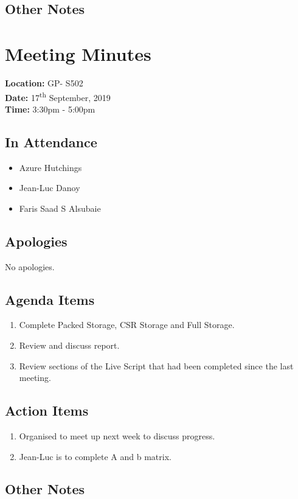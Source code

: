\documentclass{article}
\begin{document}
\subsection*{Other Notes}

\pagebreak

\section{Meeting Minutes}
\textbf{Location:} GP- S502 \\
\textbf{Date:} 17\textsuperscript{th} September, 2019 \\
\textbf{Time:} 3:30pm - 5:00pm

\subsection*{In Attendance}
\begin{itemize}
\item Azure Hutchings
\item Jean-Luc Danoy
\item Faris Saad S Alsubaie
\end{itemize}

\subsection*{Apologies}
No apologies. 

\subsection*{Agenda Items}
\begin{enumerate}
\item Complete Packed Storage, CSR Storage and Full Storage.
\item Review and discuss report.
\item Review sections of the Live Script that had been completed since the last meeting.
\ 
\end{enumerate}

\subsection*{Action Items}
\begin{enumerate}
\item Organised to meet up next week to discuss progress.
\item Jean-Luc is to complete A and b matrix.
\end{enumerate}

\subsection*{Other Notes}

\pagebreak
\end{document}
